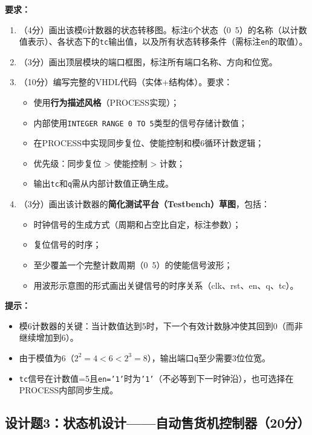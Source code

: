 \textbf{要求：}
\begin{enumerate}[label=(\arabic*)]
  \item （4分）画出该模6计数器的状态转移图。标注6个状态（0~5）的名称（以计数值表示）、各状态下的\texttt{tc}输出值，以及所有状态转移条件（需标注\texttt{en}的取值）。
  \item （3分）画出顶层模块的端口框图，标注所有端口名称、方向和位宽。
  \item （10分）编写完整的VHDL代码（实体+结构体）。要求：
  \begin{itemize}
    \item 使用\textbf{行为描述风格}（PROCESS实现）；
    \item 内部使用\texttt{INTEGER RANGE 0 TO 5}类型的信号存储计数值；
    \item 在PROCESS中实现同步复位、使能控制和模6循环计数逻辑；
    \item 优先级：同步复位 > 使能控制 > 计数；
    \item 输出\texttt{tc}和\texttt{q}需从内部计数值正确生成。
  \end{itemize}
  \item （3分）画出该计数器的\textbf{简化测试平台（Testbench）草图}，包括：
  \begin{itemize}
    \item 时钟信号的生成方式（周期和占空比自定，标注参数）；
    \item 复位信号的时序；
    \item 至少覆盖一个完整计数周期（0~5）的使能信号波形；
    \item 用波形示意图的形式画出关键信号的时序关系（clk、rst、en、q、tc）。
  \end{itemize}
\end{enumerate}

\begin{framed}
\textbf{提示：}
\begin{itemize}
  \item 模6计数器的关键：当计数值达到5时，下一个有效计数脉冲使其回到0（而非继续增加到6）。
  \item 由于模值为6（$2^2=4 < 6 < 2^3=8$），输出端口\texttt{q}至少需要3位位宽。
  \item \texttt{tc}信号在计数值=5且\texttt{en='1'}时为\texttt{'1'}（不必等到下一时钟沿），也可选择在PROCESS内部同步生成。
\end{itemize}
\end{framed}

\newpage

\subsection*{设计题3：状态机设计——自动售货机控制器（20分）}

